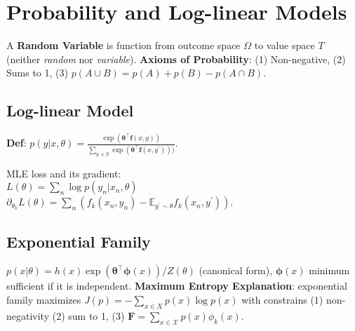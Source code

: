 \section{Probability and Log-linear Models}
A \textbf{Random Variable} is function from outcome space $\Omega$ to value space $T$ (neither \textit{random} nor \textit{variable}). 
\textbf{Axioms of Probability}: (1) Non-negative, (2) Sums to 1, (3) $p(A \cup B)=p(A) + p(B) - p(A\cap B)$.
\subsection*{Log-linear Model}
\textbf{Def}: $p(y| x, \theta)  = \frac{\exp(\mathbf{\theta}^{\top}\mathbf{f}(x,y))}{\sum_{y^\prime \in \mathcal{Y}}\exp(\mathbf{\theta}^{\top}\mathbf{f}(x,y^\prime)))}$.

MLE loss and its gradient: \\
$L(\theta)=\sum_{n} \log p(y_n| x_n, \theta)$ \\
$\partial_{\theta_k}L(\theta) = \sum_{n} \left( f_k(x_n, y_n) - \mathbb{E}_{y^{\prime}
\sim \theta}f_k(x_n, y^\prime) \right) $.

\subsection*{Exponential Family}
$p(x|\theta) = h(x)\exp(\mathbf{\theta}^{\top} \mathbf{\phi}(x)) / {Z(\theta)}$ (canonical form), $\mathbf{\phi}(x)$ minimum sufficient if it is independent. \textbf{Maximum Entropy Explanation}: exponential family maximizes $J(p)=-\sum_{x \in X} p(x) \log p(x)$ with constrains (1) non-negativity (2) sum to 1, (3) $\mathbf{F}=\sum_{x \in \mathcal{X}} p(x) \phi_{k}(x)$.
